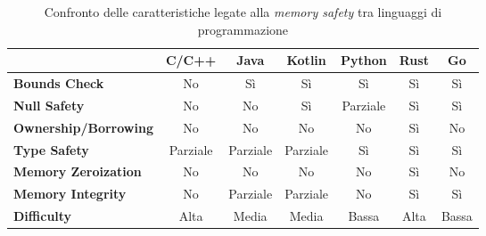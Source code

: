 \small
\setlength{\tabcolsep}{4pt}
\begin{table}[H]
  \centering
  \begin{tabular}{l|c|c|c|c|c|c|}
    \multicolumn{1}{l}{}         & \textbf{C/C++}                & \textbf{Java}                 & \textbf{Kotlin}               & \textbf{Python}               & \textbf{Rust}                       & \textbf{Go}               \\
    \hline
    \textbf{Bounds Check}        & \cellcolor{red!20}No          & \cellcolor{green!20}Sì        & \cellcolor{green!20}Sì        & \cellcolor{green!20}Sì        & \cellcolor{green!20}Sì              & \cellcolor{green!20}Sì    \\
    \textbf{Null Safety}         & \cellcolor{red!20}No          & \cellcolor{red!20}No          & \cellcolor{green!20}Sì        & \cellcolor{yellow!20}Parziale & \cellcolor{green!20}Sì              & \cellcolor{green!20}Sì    \\
    \textbf{Ownership/Borrowing} & \cellcolor{red!20}No          & \cellcolor{red!20}No          & \cellcolor{red!20}No          & \cellcolor{red!20}No          & \cellcolor{green!20}Sì              & \cellcolor{red!20}No      \\
    \textbf{Type Safety}         & \cellcolor{yellow!20}Parziale & \cellcolor{yellow!20}Parziale & \cellcolor{yellow!20}Parziale & \cellcolor{green!20}Sì        & \cellcolor{green!20}Sì              & \cellcolor{green!20}Sì    \\
    \textbf{Memory Zeroization}  & \cellcolor{red!20}No          & \cellcolor{red!20}No          & \cellcolor{red!20}No          & \cellcolor{red!20}No          & \cellcolor{green!20}Sì\footnotemark & \cellcolor{red!20}No      \\
    \textbf{Memory Integrity}    & \cellcolor{red!20}No          & \cellcolor{yellow!20}Parziale & \cellcolor{yellow!20}Parziale & \cellcolor{red!20}No          & \cellcolor{green!20}Sì              & \cellcolor{green!20}Sì    \\
    \textbf{Difficulty}          & \cellcolor{red!20}Alta        & \cellcolor{yellow!20}Media    & \cellcolor{yellow!20}Media    & \cellcolor{green!20}Bassa     & \cellcolor{red!20}Alta              & \cellcolor{green!20}Bassa \\
    \hline
  \end{tabular}
  \caption{Confronto delle caratteristiche legate alla \textit{memory safety} tra
  linguaggi di programmazione}
  \label{tab:linguaggi_memory_safety}
\end{table}

